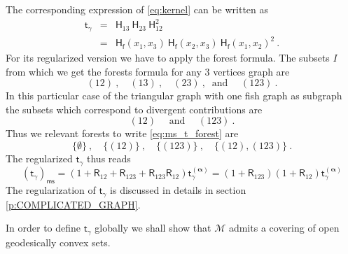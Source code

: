 \documentclass[12pt]{book}
\newcommand{\ms}{\mathsf{ms}}
\newcommand{\Mcal}{\mathcal{M}}
\newcommand{\Hsf}{\mathsf{H}}
\newcommand{\Rsf}{\mathsf{R}}
\newcommand{\fsf}{\mathsf{f}}
\newcommand{\tsf}{\mathsf{t}}
\theoremstyle{break}
\begin{document}
\begin{figure}
\begin{center}
\end{center}
\end{figure}


The corresponding expression of \ref{eq:kernel} can be written as 
%
\begin{eqnarray*}
\tsf_\gamma &=& \Hsf_{13} \ \Hsf_{23} \ \Hsf_{12}^2 \\
&=& \Hsf_\fsf(x_1,x_3) \ \Hsf_\fsf(x_2,x_3) \ \Hsf_\fsf(x_1,x_2)^2 \ .
\end{eqnarray*}
%
For its regularized version we have to apply the forest formula. The subsets $I$ from which we get the forests formula for any $3$ vertices graph are
%
\begin{equation*}
(12) \ , \quad (13) \ , \quad (23) \ , \ \mbox{ and } \quad (123) \ .
\end{equation*}
%
In this particular case of the triangular graph with one fish graph as subgraph the subsets which correspond to divergent contributions are 
%
\begin{equation*}
(12) \quad \mbox{ and } \quad (123) \ .
\end{equation*}
%
Thus we relevant forests to write \eqref{eq:ms_t_forest} are 
%
\begin{equation*}
\{\emptyset\} \ , \quad \{(12)\} \ , \quad \{(123)\} \ , \quad \{(12),(123)\} \ .
\end{equation*} 
%
The regularized $\tsf_\gamma$ thus reads
\begin{equation}
\left(\tsf_\gamma\right)_\ms = \left(1+\Rsf_{12}+\Rsf_{123}+\Rsf_{123}\Rsf_{12}\right) \tsf^{(\boldsymbol{\alpha})}_\gamma = (1+\Rsf_{123})(1+\Rsf_{12}) \tsf^{(\boldsymbol{\alpha})}_\gamma
\label{eq:kernel_trig_ms}
\end{equation}
The regularization of $\tsf_\gamma$ is discussed in details in section \ref{p:COMPLICATED_GRAPH}. 


In order to define $\tsf_\gamma$ globally we shall show that $\Mcal$ admits a covering of open geodesically convex sets.
\end{document}
